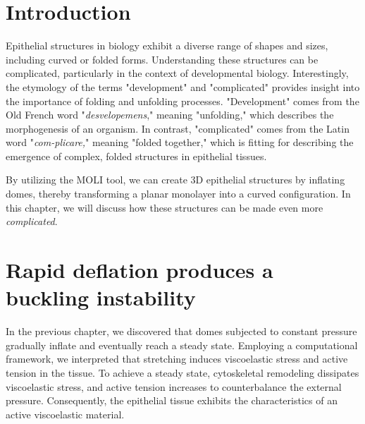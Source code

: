 \hypertarget{introduction}{%
\section{Introduction}\label{introduction5}}

Epithelial structures in biology exhibit a diverse range of shapes and sizes, including curved or folded forms. Understanding these structures can be complicated, particularly in the context of developmental biology. Interestingly, the etymology of the terms "development" and "complicated" provides insight into the importance of folding and unfolding processes. "Development" comes from the Old French word "\textit{desvelopemens}," meaning "unfolding," which describes the morphogenesis of an organism. In contrast, "complicated" comes from the Latin word "\textit{com-plicare,}" meaning "folded together," which is fitting for describing the emergence of complex, folded structures in epithelial tissues.

By utilizing the MOLI tool, we can create 3D epithelial structures by inflating domes, thereby transforming a planar monolayer into a curved configuration. In this chapter, we will discuss how these structures can be made even more \textit{complicated}. %

\hypertarget{rapid-deflation-produces-a-buckling-instability}{%
	\section{Rapid deflation produces a buckling
		instability}\label{rapid-deflation-produces-a-buckling-instability}}


In the previous chapter, we discovered that domes subjected to constant pressure gradually inflate and eventually reach a steady state. Employing a computational framework, we interpreted that stretching induces viscoelastic stress and active tension in the tissue. To achieve a steady state, cytoskeletal remodeling dissipates viscoelastic stress, and active tension increases to counterbalance the external pressure. Consequently, the epithelial tissue exhibits the characteristics of an active viscoelastic material.

